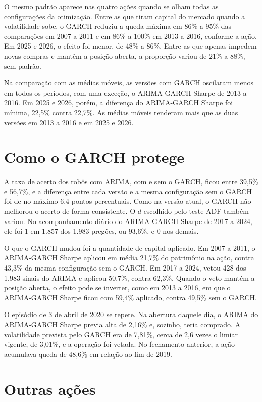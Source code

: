 O mesmo padrão aparece nas quatro ações quando se olham todas as configurações da
otimização. Entre as que tiram capital do mercado quando a volatilidade sobe, o
GARCH reduziu a queda máxima em 86\% a 95\% das comparações em 2007 a 2011 e em
86\% a 100\% em 2013 a 2016, conforme a ação. Em 2025 e 2026, o efeito foi menor,
de 48\% a 86\%. Entre as que apenas impedem novas compras e mantêm a posição
aberta, a proporção variou de 21\% a 88\%, sem padrão.

Na comparação com as médias móveis, as versões com GARCH oscilaram menos em todos
os períodos, com uma exceção, o ARIMA-GARCH Sharpe de 2013 a 2016. Em 2025 e
2026, porém, a diferença do ARIMA-GARCH Sharpe foi mínima, 22,5\% contra 22,7\%. As médias móveis
renderam mais que as duas versões em 2013 a 2016 e em 2025 e 2026.

\section{Como o GARCH protege}
\label{sec:mecanismo-j}

A taxa de acerto dos robôs com ARIMA, com e sem o GARCH, ficou entre 39,5\% e
56,7\%, e a diferença entre cada versão e a mesma configuração sem o GARCH foi de
no máximo 6,4 pontos percentuais. Como na versão atual, o GARCH não melhorou o
acerto de forma consistente. O $d$ escolhido pelo teste ADF também variou. No
acompanhamento diário do ARIMA-GARCH Sharpe de 2017 a 2024, ele foi 1 em 1.857
dos 1.983 pregões, ou 93,6\%, e 0 nos demais.

O que o GARCH mudou foi a quantidade de capital aplicado. Em 2007 a 2011, o
ARIMA-GARCH Sharpe aplicou em média 21,7\% do patrimônio na ação, contra 43,3\% da
mesma configuração sem o GARCH. Em 2017 a 2024, vetou 428 dos 1.983 sinais do
ARIMA e aplicou 50,7\%, contra 62,3\%. Quando o veto mantém a posição aberta, o
efeito pode se inverter, como em 2013 a 2016, em que o ARIMA-GARCH Sharpe ficou
com 59,4\% aplicado, contra 49,5\% sem o GARCH.

O episódio de 3 de abril de 2020 se repete. Na abertura daquele dia, o ARIMA do
ARIMA-GARCH Sharpe previa alta de 2,16\% e, sozinho, teria comprado. A volatilidade
prevista pelo GARCH era de 7,81\%, cerca de 2,6 vezes o limiar vigente, de 3,01\%,
e a operação foi vetada. No fechamento anterior, a ação acumulava queda de 48,6\%
em relação ao fim de 2019.

\section{Outras ações}


